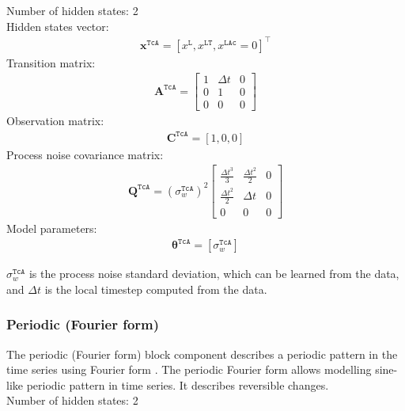 \noindent
Number of hidden states: 2\\
Hidden states vector: 
\begin{gather*}
 \mathbf{x}^{\mathtt{TcA}} = [x^{\mathtt{L}}, x^{\mathtt{LT}} , x^{\mathtt{LAc}}=0]^{\intercal}
 \end{gather*}
Transition matrix: 
\begin{gather*}
\mathbf{A}^{\mathtt{TcA}}= \left[\begin{array}{ccc}1&\Delta t&0\\0&1&0\\0&0&0\end{array}\right]
\end{gather*}
Observation matrix: 
\begin{gather*}
\mathbf{C}^{\mathtt{TcA}}=[1, 0, 0]
\end{gather*}
Process noise covariance matrix: 
\begin{gather*}
\mathbf{Q}^{\mathtt{TcA}}=(\sigma_{w}^{\mathtt{TcA}})^{2}  \left[\begin{array}{ccc}\tfrac{\Delta t^{3}}{3} &\tfrac{\Delta t^{2}}{2}&0\\\tfrac{\Delta t^{2}}{2}&\Delta t&0\\0&0&0\end{array}\right] 
\end{gather*}
Model parameters: 
\begin{gather*}
\bm\theta^{\mathtt{TcA}}=[\sigma_{w}^{\mathtt{TcA}} ]
\end{gather*}

\noindent
$\sigma_{w}^{\mathtt{TcA}}$ is the process noise standard deviation, which can be learned from the data, and $\Delta t$ is the local timestep computed from the data.



\subsubsection{Periodic (Fourier form)}

The periodic (Fourier form) block component describes a periodic pattern in the time series using Fourier form \cite{west1999bayesian,STC:STC2035}. 
The periodic Fourier form allows modelling sine-like periodic pattern in time series.
It describes reversible changes.\\

\noindent
Number of hidden states: 2\\

